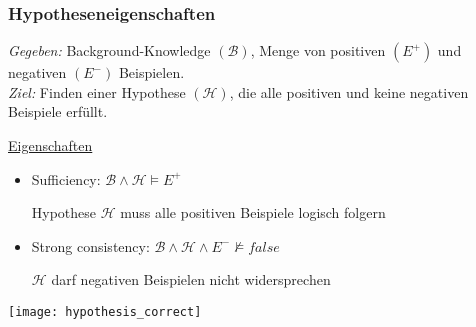 \begin{frame}
	\frametitle{Hypotheseneigenschaften}
	\emph{Gegeben:} Background-Knowledge $(\mathcal{B})$, Menge von positiven $(E^+)$ und negativen
	$(E^-)$ Beispielen.\\
	\emph{Ziel:} Finden einer Hypothese $(\mathcal{H})$, die alle positiven und keine negativen
	Beispiele erfüllt.

	\begin{minipage}{0.5\textwidth}
		\vspace{5pt}
		\underline{Eigenschaften}
		\begin{itemize}
			\item Sufficiency:        $\mathcal{B} \land \mathcal{H} \vDash E^{+}$

				Hypothese $\mathcal{H}$ muss alle positiven Beispiele logisch folgern

			\item Strong consistency: $\mathcal{B} \land \mathcal{H} \land E^{-} \nvDash false$

				$\mathcal{H}$ darf negativen Beispielen nicht widersprechen
		\end{itemize}
	\end{minipage}
	\begin{minipage}{0.45\textwidth}
		\centering
		\texttt{[image: hypothesis\_correct]}
	\end{minipage}
\end{frame}
%
%
%
%
%
%
%
%
